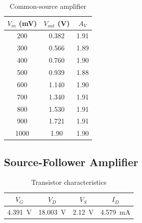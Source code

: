 \begin{table}[hbtp]
  \centering
  \begin{tabular}{ccc}
    $V_{in}$ (\si{mV}) & $V_{out}$ (\si{V}) & $A_V$ \\
    \hline
    200                & 0.382              & 1.91  \\
    300                & 0.566              & 1.89  \\
    400                & 0.760              & 1.90  \\
    500                & 0.939              & 1.88  \\
    600                & 1.140              & 1.90  \\
    700                & 1.340              & 1.91  \\
    800                & 1.530              & 1.91  \\
    900                & 1.721              & 1.91  \\
    1000               & 1.90               & 1.90  \\
  \end{tabular}
  \caption{\label{tab:common-source} Common-source amplifier}
\end{table}

\subsection{Source-Follower Amplifier}

\begin{table}[hbtp]
  \centering
  \begin{tabular}{cccc}
    $V_G$ & $V_D$ & $V_S$ & $I_D$ \\
    \hline
    \SI{4.391}{V} & \SI{18.003}{V} & \SI{2.12}{V} & \SI{4.579}{mA} \\
  \end{tabular}
  \caption{\label{tab:tran_follower} Transistor characteristics}
\end{table}

